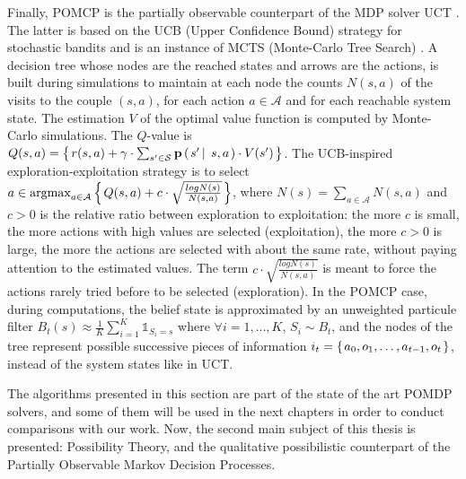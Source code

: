 Finally, POMCP \cite{NIPS2010_4031} is the partially observable counterpart 
of the MDP solver UCT \cite{Kocsis:2006:BBM:2091602.2091633}. 
The latter is based on the UCB (Upper Confidence Bound) strategy for stochastic bandits \cite{Auer:2002:FAM:599614.599677}
and is an instance of MCTS (Monte-Carlo Tree Search) \cite{2008}.
A decision tree whose nodes are the reached states and arrows are the actions, 
is built during simulations to maintain at each node
the counts $N(s,a)$ of the visits to the couple $(s,a)$, 
for each action $a \in \mathcal{A}$ and for each reachable system state.
The estimation $V$ of the optimal value function
is computed by Monte-Carlo simulations.
The $Q$-value is $Q(s,a) = \left\{ \left.  r(s,a) + \gamma \cdot \sum_{s' \in \mathcal{S}} \textbf{p} \left( \left.  s' \, \right| \left. \, s,a  \right. \right) \cdot V(s')  \right. \right\}$.
The UCB-inspired exploration-exploitation strategy is to select 
$a \in \operatorname*{argmax}_{a \in \mathcal{A}} \left\{ \left.  Q(s,a)+ c \cdot \sqrt{ \frac{log N(s)}{N(s,a)} }  \right. \right\}$, 
where $N(s) = \sum_{a \in \mathcal{A}} N(s,a)$ 
and $c>0$ is the relative ratio between exploration to exploitation: 
the more $c$ is small, the more actions with high values are selected (exploitation),
the more $c>0$ is large, the more the actions are selected with about the same rate,
without paying attention to the estimated values. 
The term $c \cdot \sqrt{ \frac{log N(s)}{N(s,a)} }$ is meant to
force the actions rarely tried before to be selected (exploration).
In the POMCP case, during computations, 
the belief state is approximated 
by an unweighted particule filter $B_t(s) \approx \frac{1}{K} \sum_{i=1}^{K} \mathds{1}_{S_i = s}$
where $\forall i=1,\ldots,K$, $S_i \sim B_t$, 
and the nodes of the tree represent possible successive pieces of information 
$i_t = \left\{ \left. a_0,o_1,\ldots,a_{t-1},o_t \right. \right\}$, 
instead of the system states like in UCT.

The algorithms presented in this section 
are part of the state of the art POMDP solvers,
and some of them will be used in the next chapters
in order to conduct comparisons with our work.
Now, the second main subject of this thesis
is presented: Possibility Theory, and the qualitative possibilistic counterpart
of the Partially Observable Markov Decision Processes.
